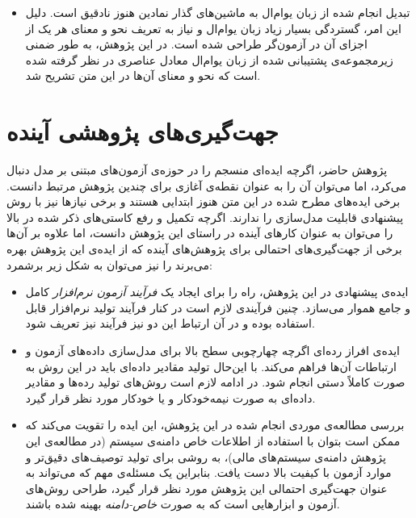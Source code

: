 \begin{itemize}
\item تبدیل انجام شده از زبان یوام‌ال به ماشین‌های گذار نمادین هنوز نادقیق است. دلیل این امر، گستردگی بسیار زیاد زبان یو‌ام‌ال و نیاز به تعریف نحو و معنای هر یک از اجزای آن در آزمون‌گر طراحی شده است. در این پژوهش، به طور ضمنی زیرمجموعه‌ی پشتیبانی شده از زبان یو‌ام‌ال معادل عناصری در نظر گرفته شده است که نحو و معنای آن‌ها در این متن تشریح شد.
\end{itemize}
 
\section{جهت‌گیری‌های پژوهشی آینده}
پژوهش حاضر، اگرچه ایده‌ای منسجم را در حوزه‌ی آزمون‌های مبتنی بر مدل دنبال می‌کرد، اما می‌توان آن را به عنوان نقطه‌ی آغازی برای چندین پژوهش مرتبط دانست. برخی ایده‌های مطرح شده در این متن هنوز ابتدایی هستند و برخی نیازها نیز با روش پیشنهادی قابلیت مدل‌سازی را ندارند. اگرچه تکمیل و رفع کاستی‌های ذکر شده در بالا را می‌توان به عنوان کارهای آینده در راستای این پژوهش دانست، اما علاوه بر آن‌ها برخی از جهت‌گیری‌های احتمالی برای پژوهش‌های آینده که از ایده‌ی این پژوهش بهره می‌برند را نیز می‌توان به شکل زیر برشمرد:
\begin{itemize}
\item ایده‌ی پیشنهادی در این پژوهش، راه را برای ایجاد یک \emph{فرآیند آزمون نرم‌افزار} کامل و جامع هموار می‌سازد. چنین فرآیندی لازم است در کنار فرآیند تولید نرم‌افزار قابل استفاده بوده و در آن ارتباط این دو نیز فرآیند نیز تعریف شود.

\item ایده‌ی افراز رده‌ای اگرچه چهارچوبی سطح بالا برای مدل‌سازی داده‌های آزمون و ارتباطات آن‌ها فراهم می‌کند. با این‌حال تولید مقادیر داده‌ای باید در این روش به صورت کاملاً دستی انجام شود. در ادامه لازم است روش‌های تولید رده‌ها و مقادیر داده‌ای به صورت نیمه‌خودکار و یا خودکار مورد نظر قرار گیرد.

\item بررسی مطالعه‌ی موردی انجام شده در این پژوهش، این ایده را تقویت می‌کند که ممکن است بتوان با استفاده از اطلاعات خاص دامنه‌ی سیستم (در مطالعه‌ی این پژوهش دامنه‌ی سیستم‌های مالی)، به روشی برای تولید توصیف‌های دقیق‌تر و موارد آزمون با کیفیت بالا دست یافت. بنابراین یک مسئله‌ی مهم که می‌تواند به عنوان جهت‌گیری احتمالی این پژوهش مورد نظر قرار گیرد، طراحی روش‌های آزمون و ابزارهایی است که به صورت \emph{\gls*{خاص-دامنه}} بهینه شده باشند.
\end{itemize}

